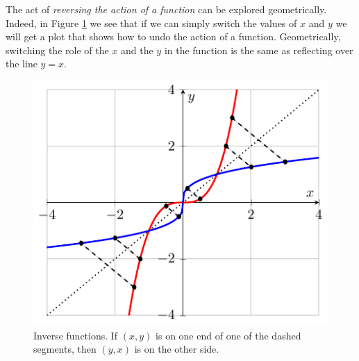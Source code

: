 The act of {\it reversing the action of a function} can be explored geometrically.
Indeed, in Figure \ref{fig:0.3.inv} we see that if we can simply switch the values of $x$
and $y$ we will get a plot that shows how to undo the action of a function. Geometrically,
switching the role of the $x$ and the $y$ in the function is the same as reflecting over
the line $y=x$.
\begin{figure}[h!]
    \begin{center}
            \includegraphics[width=0.5\columnwidth]{figures/0-3-fig5.pdf}
    \end{center}
    \caption{Inverse functions. If $(x,y)$ is on one end of one of the dashed segments,
    then $(y,x)$ is on the other side.}
    \label{fig:0.3.inv}
\end{figure}

